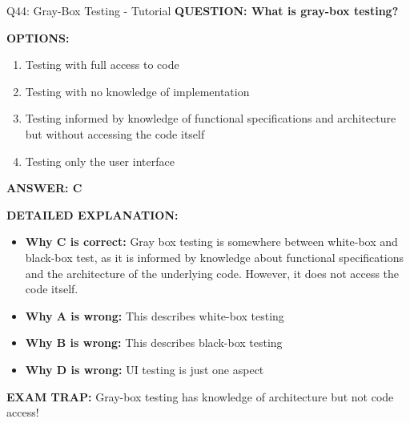 \documentclass[8pt]{beamer}
\begin{document}
	\begin{frame}{Q44: Gray-Box Testing - Tutorial}
		\fontsize{6.5}{7.5}\selectfont
		\textbf{QUESTION: What is gray-box testing?}
		
		\vspace{0.1cm}
		\textbf{OPTIONS:}
		\begin{enumerate}
			\item Testing with full access to code
			\item Testing with no knowledge of implementation
			\item Testing informed by knowledge of functional specifications and architecture but without accessing the code itself
			\item Testing only the user interface
		\end{enumerate}
		
		\vspace{0.1cm}
		\textcolor{myblue}{\textbf{ANSWER: C}}
		
		\vspace{0.1cm}
		\textbf{DETAILED EXPLANATION:}
		\begin{itemize}
			\item \textbf{Why C is correct:} Gray box testing is somewhere between white-box and black-box test, as it is informed by knowledge about functional specifications and the architecture of the underlying code. However, it does not access the code itself.
			\item \textbf{Why A is wrong:} This describes white-box testing
			\item \textbf{Why B is wrong:} This describes black-box testing
			\item \textbf{Why D is wrong:} UI testing is just one aspect
		\end{itemize}
		
		\textcolor{myred}{\textbf{EXAM TRAP:}} Gray-box testing has \textcolor{myblue}{knowledge of architecture but not code access}!
	\end{frame}
	
\end{document}

